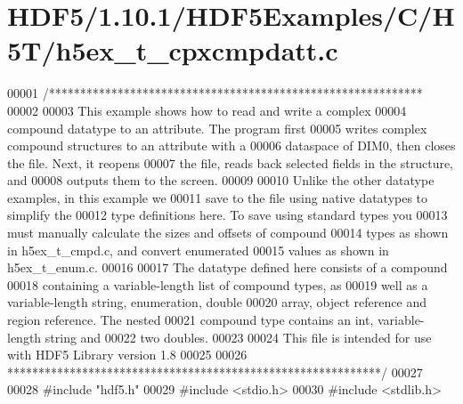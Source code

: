 \hypertarget{_h_d_f5_21_810_81_2_h_d_f5_examples_2_c_2_h5_t_2h5ex__t__cpxcmpdatt_8c_source}{}\section{H\+D\+F5/1.10.1/\+H\+D\+F5\+Examples/\+C/\+H5\+T/h5ex\+\_\+t\+\_\+cpxcmpdatt.c}
\label{_h_d_f5_21_810_81_2_h_d_f5_examples_2_c_2_h5_t_2h5ex__t__cpxcmpdatt_8c_source}

\begin{DoxyCode}
00001 \textcolor{comment}{/************************************************************}
00002 \textcolor{comment}{}
00003 \textcolor{comment}{  This example shows how to read and write a complex}
00004 \textcolor{comment}{  compound datatype to an attribute.  The program first}
00005 \textcolor{comment}{  writes complex compound structures to an attribute with a}
00006 \textcolor{comment}{  dataspace of DIM0, then closes the file.  Next, it reopens}
00007 \textcolor{comment}{  the file, reads back selected fields in the structure, and}
00008 \textcolor{comment}{  outputs them to the screen.}
00009 \textcolor{comment}{}
00010 \textcolor{comment}{  Unlike the other datatype examples, in this example we}
00011 \textcolor{comment}{  save to the file using native datatypes to simplify the}
00012 \textcolor{comment}{  type definitions here.  To save using standard types you}
00013 \textcolor{comment}{  must manually calculate the sizes and offsets of compound}
00014 \textcolor{comment}{  types as shown in h5ex\_t\_cmpd.c, and convert enumerated}
00015 \textcolor{comment}{  values as shown in h5ex\_t\_enum.c.}
00016 \textcolor{comment}{}
00017 \textcolor{comment}{  The datatype defined here consists of a compound}
00018 \textcolor{comment}{  containing a variable-length list of compound types, as}
00019 \textcolor{comment}{  well as a variable-length string, enumeration, double}
00020 \textcolor{comment}{  array, object reference and region reference.  The nested}
00021 \textcolor{comment}{  compound type contains an int, variable-length string and}
00022 \textcolor{comment}{  two doubles.}
00023 \textcolor{comment}{}
00024 \textcolor{comment}{  This file is intended for use with HDF5 Library version 1.8}
00025 \textcolor{comment}{}
00026 \textcolor{comment}{ ************************************************************/}
00027 
00028 \textcolor{preprocessor}{#include "hdf5.h"}
00029 \textcolor{preprocessor}{#include <stdio.h>}
00030 \textcolor{preprocessor}{#include <stdlib.h>}

\end{DoxyCode}

